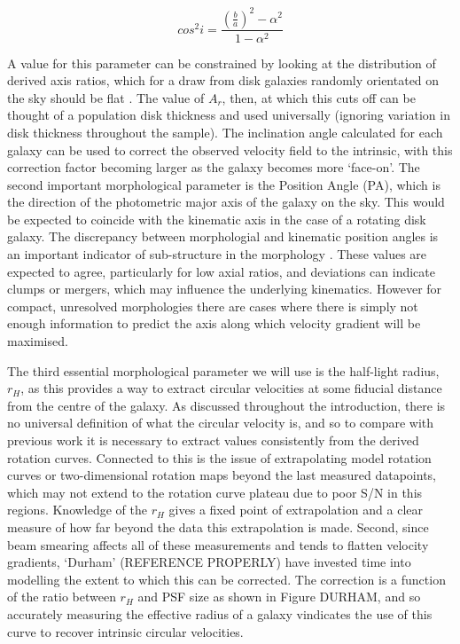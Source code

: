 \documentclass[a4paper,fleqn,usenatbib]{mn2e}
\begin{document}
\begin{equation}\label{eq:holmberg_i}
   cos^{2}i = \frac{\left(\frac{b}{a}\right)^{2} - \alpha^{2}}{1 - \alpha^{2}}
\end{equation}

A value for this parameter can be constrained by looking at the distribution of derived axis ratios, which for a draw from disk galaxies randomly orientated on the sky should be flat \citep{Sandage1970}.
The value of $A_{r}$, then, at which this cuts off can be thought of a population disk thickness and used universally (ignoring variation in disk thickness throughout the sample).
The inclination angle calculated for each galaxy can be used to correct the observed velocity field to the intrinsic, with this correction factor becoming larger as the galaxy becomes more `face-on'.
The second important morphological parameter is the Position Angle (PA), which is the direction of the photometric major axis of the galaxy on the sky.
This would be expected to coincide with the kinematic axis in the case of a rotating disk galaxy.
The discrepancy between morphologial and kinematic position angles is an important indicator of sub-structure in the morphology \citep{Queyrel2012,Wisnioski2015}.
These values are expected to agree, particularly for low axial ratios, and deviations can indicate clumps or mergers, which may influence the underlying kinematics. 
However for compact, unresolved morphologies there are cases where there is simply not enough information to predict the axis along which velocity gradient will be maximised.

The third essential morphological parameter we will use is the half-light radius, $r_{H}$, as this provides a way to extract circular velocities at some fiducial distance from the centre of the galaxy.
As discussed throughout the introduction, there is no universal definition of what the circular velocity is, and so to compare with previous work it is necessary to extract values consistently from the derived rotation curves.
Connected to this is the issue of extrapolating model rotation curves or two-dimensional rotation maps beyond the last measured datapoints, which may not extend to the rotation curve plateau due to poor S/N in this regions.
Knowledge of the $r_{H}$ gives a fixed point of extrapolation and a clear measure of how far beyond the data this extrapolation is made.
Second, since beam smearing affects all of these measurements and tends to flatten velocity gradients, `Durham' (REFERENCE PROPERLY) have invested time into modelling the extent to which this can be corrected.
The correction is a function of the ratio between $r_{H}$ and PSF size as shown in Figure DURHAM, and so accurately measuring the effective radius of a galaxy vindicates the use of this curve to recover intrinsic circular velocities. 
\end{document}
